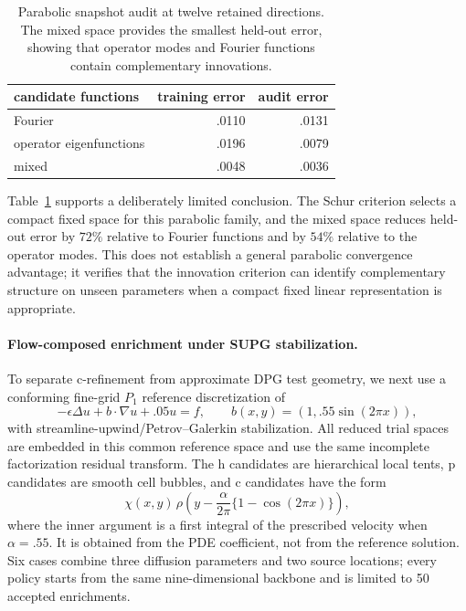 \documentclass[11pt]{article}
\numberwithin{algorithm}{section}
\theoremstyle{definition}\newtheorem{definition}[theorem]{Definition}
\theoremstyle{remark}\newtheorem{remark}[theorem]{Remark}
\begin{document}
\begin{table}[t]
\centering
\caption{Parabolic snapshot audit at twelve retained directions.  The mixed
space provides the smallest held-out error, showing that operator modes and
Fourier functions contain complementary innovations.}
\begin{tabular}{lrr}
\toprule
candidate functions & training error & audit error\\
\midrule
Fourier & .0110 & .0131\\
operator eigenfunctions & .0196 & .0079\\
mixed & .0048 & .0036\\
\bottomrule
\end{tabular}
\label{tab:cross-class-width-audit}
\end{table}

Table~\ref{tab:cross-class-width-audit} supports a deliberately limited
conclusion.  The Schur criterion selects a compact fixed space for this
parabolic family, and the mixed space reduces held-out error by $72\%$ relative
to Fourier functions and by $54\%$ relative to the operator modes.  This does
not establish a general parabolic convergence advantage; it verifies that the
innovation criterion can identify complementary structure on unseen
parameters when a compact fixed linear representation is appropriate.

\paragraph{Flow-composed enrichment under SUPG stabilization.}
To separate c-refinement from approximate DPG test geometry, we next use a
conforming fine-grid $P_1$ reference discretization of
\[
 -\epsilon\Delta u+b\cdot\nabla u+.05u=f,
 \qquad b(x,y)=(1,.55\sin(2\pi x)),
\]
with streamline-upwind/Petrov--Galerkin stabilization. All reduced trial
spaces are embedded in this common reference space and use the same incomplete
factorization residual transform. The h candidates are hierarchical local
tents, p candidates are smooth cell bubbles, and c candidates have the form
\[
 \chi(x,y)\,\rho\!\left(y-
   \frac{\alpha}{2\pi}\{1-\cos(2\pi x)\}\right),
\]
where the inner argument is a first integral of the prescribed velocity when
$\alpha=.55$. It is obtained from the PDE coefficient, not from the reference
solution. Six cases combine three diffusion parameters and two source
locations; every policy starts from the same nine-dimensional backbone and is
limited to 50 accepted enrichments.
\end{document}
